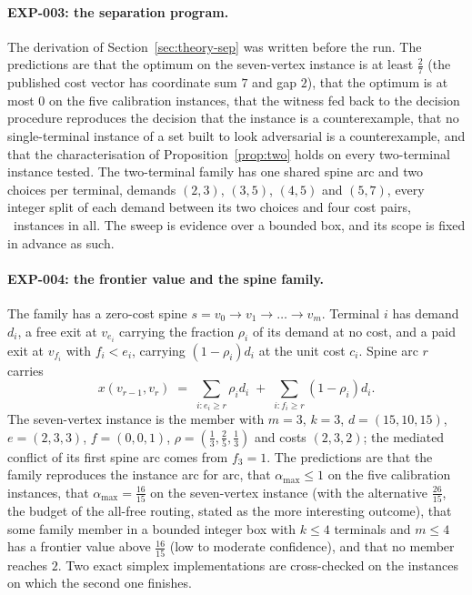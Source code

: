 \documentclass[11pt]{article}
\theoremstyle{remark}
\newcommand{\EXP}[1]{\mbox{EXP-#1}}
\begin{document}
\paragraph{\EXP{003}: the separation program.} The derivation of Section~\ref{sec:theory-sep} was written before the run. The predictions are that the optimum on the seven-vertex instance is at least $\tfrac27$ (the published cost vector has coordinate sum $7$ and gap $2$), that the optimum is at most $0$ on the five calibration instances, that the witness fed back
to the decision procedure reproduces the decision that the instance is a counterexample, that no single-terminal instance of a set built to look adversarial is a counterexample, and that the characterisation of Proposition~\ref{prop:two} holds on every two-terminal instance tested. The two-terminal family has one shared spine arc and two choices per terminal,
demands $(2,3)$, $(3,5)$, $(4,5)$ and $(5,7)$, every integer split of each demand between its two choices and four cost pairs, \ntwoterm\ instances in all. The sweep is evidence over a bounded box, and its scope is fixed in advance as such.

\paragraph{\EXP{004}: the frontier value and the spine family.} The family has a zero-cost spine $s=v_0\to v_1\to\dots\to v_m$. Terminal $i$ has demand $d_i$, a free exit at $v_{e_i}$ carrying the fraction $\rho_i$ of its demand at
no cost, and a paid exit at $v_{f_i}$ with $f_i<e_i$, carrying $(1-\rho_i)d_i$ at the unit cost $c_i$. Spine arc $r$ carries
\begin{equation}
x(v_{r-1},v_r)\;=\;\sum_{i\colon e_i\ge r}\rho_id_i\;+\;\sum_{i\colon f_i\ge r}(1-\rho_i)d_i .
\label{eq:spine}
\end{equation}
The seven-vertex instance is the member with $m=3$, $k=3$, $d=(15,10,15)$, $e=(2,3,3)$, $f=(0,0,1)$, $\rho=(\tfrac13,\tfrac25,\tfrac13)$ and costs $(2,3,2)$; the mediated conflict of its first spine arc comes from $f_3=1$. The predictions are that
the family reproduces the instance arc for arc, that $\alpha_{\max}\le1$ on the five calibration instances, that $\alpha_{\max}=\tfrac{16}{15}$ on the seven-vertex instance (with the alternative $\tfrac{26}{15}$, the budget of the all-free routing, stated as the more interesting outcome), that some family member in a bounded integer box with $k\le4$
terminals and $m\le4$ has a frontier value above $\tfrac{16}{15}$ (low to moderate confidence), and that no member reaches $2$. Two exact simplex implementations are cross-checked on the instances on which the second one finishes.
\end{document}
